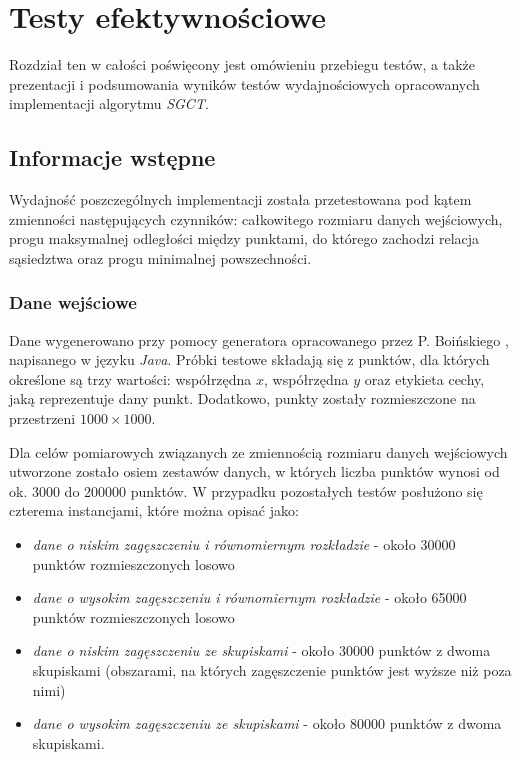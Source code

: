 \documentclass[12pt]{article}
\begin{document}

\newpage

\section{Testy efektywnościowe}
\label{sec:tests}

Rozdział ten w całości poświęcony jest omówieniu przebiegu testów, a także prezentacji i podsumowania wyników testów wydajnościowych opracowanych implementacji algorytmu \textit{SGCT}.

\subsection{Informacje wstępne}

Wydajność poszczególnych implementacji została przetestowana pod kątem zmienności następujących czynników: całkowitego rozmiaru danych wejściowych, progu maksymalnej odległości między punktami, do którego zachodzi relacja sąsiedztwa oraz progu minimalnej powszechności.

\subsubsection{Dane wejściowe}

Dane wygenerowano przy pomocy generatora opracowanego przez P. Boińskiego \cite{guwnostraszne}, napisanego w języku \textit{Java}. Próbki testowe składają się z punktów, dla których określone są trzy wartości: współrzędna $ x $, współrzędna $ y $ oraz etykieta cechy, jaką reprezentuje dany punkt. Dodatkowo, punkty zostały rozmieszczone na przestrzeni $ 1000 \times 1000$.

Dla celów pomiarowych związanych ze zmiennością rozmiaru danych wejściowych utworzone zostało osiem zestawów danych, w których liczba punktów wynosi od ok. 3000 do 200000 punktów. W przypadku pozostałych testów posłużono się czterema instancjami, które można opisać jako:
\begin{itemize}
\item \textit{dane o niskim zagęszczeniu i równomiernym rozkładzie} - około 30000 punktów rozmieszczonych losowo
\item \textit{dane o wysokim zagęszczeniu i równomiernym rozkładzie} - około 65000 punktów rozmieszczonych losowo
\item \textit{dane o niskim zagęszczeniu ze skupiskami} - około 30000 punktów z dwoma skupiskami (obszarami, na których zagęszczenie punktów jest wyższe niż poza nimi)
\item \textit{dane o wysokim zagęszczeniu ze skupiskami} - około 80000 punktów z dwoma skupiskami.
\end{itemize}
\end{document}
